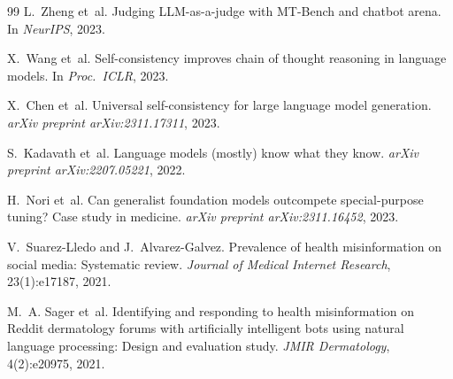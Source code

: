 \documentclass[11pt]{article}
\begin{document}
\begin{thebibliography}{99}
L.~Zheng et~al.
\newblock Judging LLM-as-a-judge with MT-Bench and chatbot arena.
\newblock In \emph{NeurIPS}, 2023.

X.~Wang et~al.
\newblock Self-consistency improves chain of thought reasoning in language
models.
\newblock In \emph{Proc.\ ICLR}, 2023.

X.~Chen et~al.
\newblock Universal self-consistency for large language model generation.
\newblock \emph{arXiv preprint arXiv:2311.17311}, 2023.

S.~Kadavath et~al.
\newblock Language models (mostly) know what they know.
\newblock \emph{arXiv preprint arXiv:2207.05221}, 2022.

H.~Nori et~al.
\newblock Can generalist foundation models outcompete special-purpose tuning?
Case study in medicine.
\newblock \emph{arXiv preprint arXiv:2311.16452}, 2023.

V.~Suarez-Lledo and J.~Alvarez-Galvez.
\newblock Prevalence of health misinformation on social media: Systematic
review.
\newblock \emph{Journal of Medical Internet Research}, 23(1):e17187, 2021.

M.~A. Sager et~al.
\newblock Identifying and responding to health misinformation on Reddit
dermatology forums with artificially intelligent bots using natural language
processing: Design and evaluation study.
\newblock \emph{JMIR Dermatology}, 4(2):e20975, 2021.

\end{thebibliography}
\end{document}
